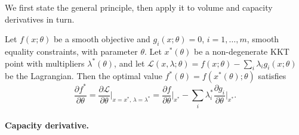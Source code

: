 We first state the general principle, then apply it to volume and capacity
derivatives in turn.

\begin{theorem*}
Let $f(x;\theta)$ be a smooth objective and $g_i(x;\theta) = 0$,
$i = 1,\dots,m$, smooth equality constraints, with parameter $\theta$.
Let $x^*(\theta)$ be a non-degenerate KKT point with multipliers
$\lambda^*(\theta)$, and let
$\mathcal{L}(x,\lambda;\theta) = f(x;\theta) - \sum_i \lambda_i g_i(x;\theta)$
be the Lagrangian.
Then the optimal value $f^*(\theta) = f(x^*(\theta);\theta)$ satisfies
\[
  \frac{\partial f^*}{\partial \theta}
  = \frac{\partial \mathcal{L}}{\partial \theta}\bigg|_{x=x^*,\,\lambda=\lambda^*}
  = \frac{\partial f}{\partial \theta}\bigg|_{x^*}
    - \sum_i \lambda_i^* \frac{\partial g_i}{\partial \theta}\bigg|_{x^*}.
\]
\end{theorem*}

\paragraph{Capacity derivative.}

